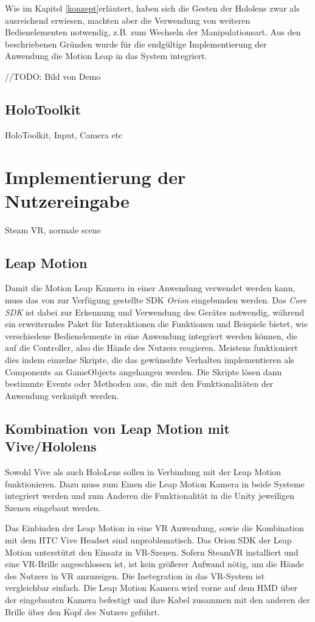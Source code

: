 Wie im Kapitel \ref{konzept}erläutert, haben sich die Gesten der Hololens zwar als ausreichend erwiesen, machten aber die Verwendung von weiteren Bedienelementen notwendig, z.B. zum Wechseln der Manipulationsart. Aus den beschriebenen Gründen wurde für die endgültige Implementierung der Anwendung die Motion Leap in das System integriert.

//TODO: Bild von Demo

\subsection{HoloToolkit}

HoloToolkit, Input, Camera etc
\section{Implementierung der Nutzereingabe}
Steam VR, normale scene

\subsection{Leap Motion}

Damit die Motion Leap Kamera in einer Anwendung verwendet werden kann, muss das von \citet{orion} zur Verfügung gestellte SDK \textit{Orion} eingebunden werden. Das \textit{Core SDK} ist dabei zur Erkennung und Verwendung des Gerätes notwendig, während ein erweiterndes Paket für Interaktionen die Funktionen und Beispiele bietet, wie verschiedene Bedienelemente in eine Anwendung integriert werden können, die auf die Controller, also die Hände des Nutzers reagieren.
Meistens funktioniert dies indem einzelne Skripte, die das gewünschte Verhalten implementieren als Components an GameObjects angehangen werden. Die Skripte lösen dann bestimmte Events oder Methoden aus, die mit den Funktionalitäten der Anwendung verknüpft werden. 

\subsection{Kombination von Leap Motion mit Vive/Hololens}
\label{kombination}

Sowohl Vive als auch HoloLens sollen in Verbindung mit der Leap Motion funktionieren. Dazu muss zum Einen die Leap Motion Kamera in beide Systeme integriert werden und zum Anderen die Funktionalität in die Unity jeweiligen Szenen eingebaut werden. 

Das Einbinden der Leap Motion in eine VR Anwendung, sowie die Kombination mit dem HTC Vive Headset sind unproblematisch. Das Orion SDK der Leap Motion unterstützt den Einsatz in VR-Szenen. Sofern SteamVR installiert und eine VR-Brille angeschlossen ist, ist kein größerer Aufwand nötig, um die Hände des Nutzers in VR anzuzeigen. 
Die Inetegration in das VR-System ist vergleichbar einfach. Die Leap Motion Kamera wird vorne auf dem HMD über der eingebauten Kamera befestigt und ihre Kabel zusammen mit den anderen der Brille über den Kopf des Nutzers geführt. 

